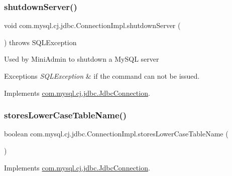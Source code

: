 \subsubsection{\texorpdfstring{shutdown\+Server()}{shutdownServer()}}
{\footnotesize\ttfamily void com.\+mysql.\+cj.\+jdbc.\+Connection\+Impl.\+shutdown\+Server (\begin{DoxyParamCaption}{ }\end{DoxyParamCaption}) throws S\+Q\+L\+Exception}

Used by Mini\+Admin to shutdown a My\+S\+QL server


\begin{DoxyExceptions}{Exceptions}
{\em S\+Q\+L\+Exception} & if the command can not be issued. \\
\hline
\end{DoxyExceptions}


Implements \mbox{\hyperlink{interfacecom_1_1mysql_1_1cj_1_1jdbc_1_1_jdbc_connection_ad9bedf228ed2ec194197ac2ceb960a94}{com.\+mysql.\+cj.\+jdbc.\+Jdbc\+Connection}}.

\mbox{\label{classcom_1_1mysql_1_1cj_1_1jdbc_1_1_connection_impl_a5febc80fce257e93dd7ed94272748558}} 
\subsubsection{\texorpdfstring{stores\+Lower\+Case\+Table\+Name()}{storesLowerCaseTableName()}}
{\footnotesize\ttfamily boolean com.\+mysql.\+cj.\+jdbc.\+Connection\+Impl.\+stores\+Lower\+Case\+Table\+Name (\begin{DoxyParamCaption}{ }\end{DoxyParamCaption})}



Implements \mbox{\hyperlink{interfacecom_1_1mysql_1_1cj_1_1jdbc_1_1_jdbc_connection_a6a1919361434e33f3de8410b87dab6e1}{com.\+mysql.\+cj.\+jdbc.\+Jdbc\+Connection}}.

\mbox{\label{classcom_1_1mysql_1_1cj_1_1jdbc_1_1_connection_impl_a65ad37d81e0865583f7896c058f7eb9f}} 
